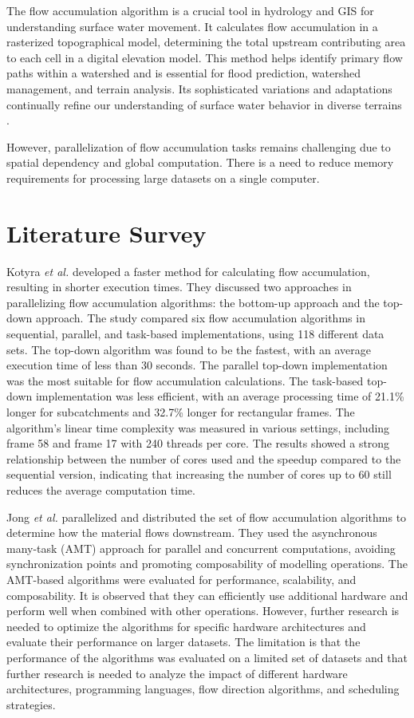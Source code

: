 \documentclass[journal, a4paper]{IEEEtran}
\begin{document}
	The flow accumulation algorithm is a crucial tool in hydrology and GIS for understanding surface water movement. It calculates flow accumulation in a rasterized topographical model, determining the total upstream contributing area to each cell in a digital elevation model. This method helps identify primary flow paths within a watershed and is essential for flood prediction, watershed management, and terrain analysis. Its sophisticated variations and adaptations continually refine our understanding of surface water behavior in diverse terrains \cite{CHO2023105771,KOTYRA2023105728}.
	
	However, parallelization of flow accumulation tasks remains challenging due to spatial dependency and global computation. There is a need to reduce memory requirements for processing large datasets on a single computer.
	
	
	\section{Literature Survey} 
	\label{sec: ls}
	
	Kotyra \textit{et al.} \cite{KOTYRA2021104741} developed a faster method for calculating flow accumulation, resulting in shorter execution times. They discussed two approaches in parallelizing flow accumulation algorithms: the bottom-up approach and the top-down approach. The study compared six flow accumulation algorithms in sequential, parallel, and task-based implementations, using 118 different data sets. The top-down algorithm was found to be the fastest, with an average execution time of less than 30 seconds. The parallel top-down implementation was the most suitable for flow accumulation calculations. The task-based top-down implementation was less efficient, with an average processing time of 21.1\% longer for subcatchments and 32.7\% longer for rectangular frames. The algorithm's linear time complexity was measured in various settings, including frame 58 and frame 17 with 240 threads per core. The results showed a strong relationship between the number of cores used and the speedup compared to the sequential version, indicating that increasing the number of cores up to 60 still reduces the average computation time.

	Jong \textit{et al.} \cite{DEJONG2022105083} parallelized and distributed the set of flow accumulation algorithms to determine how the material flows downstream. They used the asynchronous many-task (AMT) approach for parallel and concurrent computations, avoiding synchronization points and promoting composability of modelling operations. The AMT-based algorithms were evaluated for performance, scalability, and composability. It is observed that they can efficiently use additional hardware and perform well when combined with other operations. However, further research is needed to optimize the algorithms for specific hardware architectures and evaluate their performance on larger datasets. The limitation is that the performance of the algorithms was evaluated on a limited set of datasets and that further research is needed to analyze the impact of different hardware architectures, programming languages, flow direction algorithms, and scheduling strategies.
	
\end{document}
